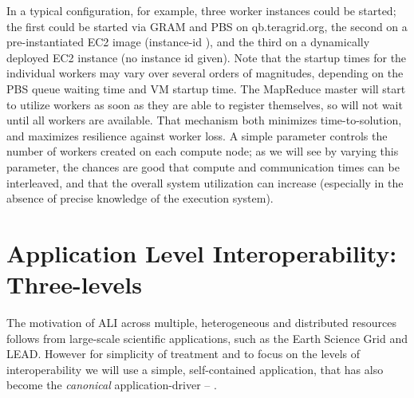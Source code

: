 \documentclass[graybox]{svmult}
\begin{document}
In a typical configuration, for example, three worker instances could
be started; the first could be started via GRAM and PBS on
qb.teragrid.org, the second on a pre-instantiated EC2 image
(instance-id ), and the third on a dynamically deployed
EC2 instance (no instance id given).  Note that the startup times for
the individual workers may vary over several orders of magnitudes,
depending on the PBS queue waiting time and VM startup time.  The
MapReduce master will start to utilize workers as soon as they are
able to register themselves, so will not wait until all workers are
available.  That mechanism both minimizes time-to-solution, and
maximizes resilience against worker loss.
%
%
A simple parameter controls the number of workers created on each
compute node; as we will see by varying this parameter, the chances
are good that compute and communication times can be interleaved, and
that the overall system utilization can increase (especially in the
absence of precise knowledge of the execution system).
 

\section{Application Level Interoperability: Three-levels}
\label{sec:interop}

The motivation of ALI across multiple, heterogeneous and distributed
resources follows from large-scale scientific applications, such as
the Earth Science Grid and LEAD. However for simplicity of treatment
and to focus on the levels of interoperability we will use a simple,
self-contained application, that has also become the {\it canonical}
\mr application-driver -- \wc.
\end{document}
